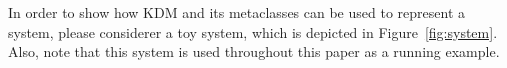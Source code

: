 
 

In order to show how KDM and its metaclasses can be used to represent a system, please considerer a toy system, which is depicted in Figure~\ref{fig:system}. Also, note that this system is used throughout this paper as a running example. 


